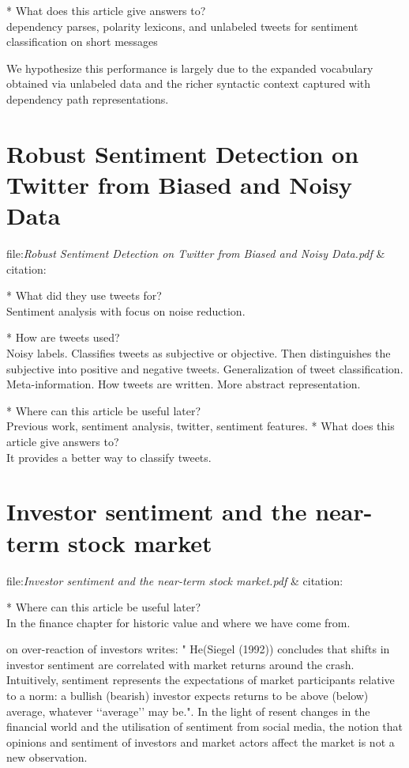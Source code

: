 * What does this article give answers to?\\
dependency parses, polarity lexicons,
and unlabeled tweets for sentiment classification on
short messages

We hypothesize this performance is largely due to the expanded vocabulary obtained via unlabeled data and the richer syntactic context captured with dependency path representations. \cite[]{becker13}


\section{Robust Sentiment Detection on Twitter from Biased and Noisy Data}
file:\textit{Robust Sentiment Detection on Twitter from Biased and Noisy
Data.pdf} & citation:\cite[]{barbosa10}

* What did they use tweets for?\\
Sentiment analysis with focus on noise reduction. 

* How are tweets used?\\
Noisy labels. Classifies tweets as subjective or objective. Then distinguishes
the subjective into positive and negative tweets.  
Generalization of tweet classification. Meta-information. How tweets are
written. More abstract representation.

* Where can this article be useful later? \\
Previous work, sentiment analysis, twitter, sentiment features. 
* What does this article give answers to?\\
It provides a better way to classify tweets. 

\section{Investor sentiment and the near-term stock market}
file:\textit{Investor sentiment and the near-term stock market.pdf} & citation:\cite[]{Brown20041}

* Where can this article be useful later? \\
In the finance chapter for historic value and where we have come from. 

\cite[p2]{brown20041} on over-reaction of investors writes: "
He(Siegel (1992)) concludes that shifts in investor sentiment are correlated with market
returns around the crash. Intuitively, sentiment represents the expectations of market participants
relative to a norm: a bullish (bearish) investor expects returns to be above
(below) average, whatever ‘‘average’’ may be.". In the light of resent changes
in the financial world and the utilisation of sentiment from social media, the
notion that opinions and sentiment of investors and market actors affect the
market is not a new observation. 

